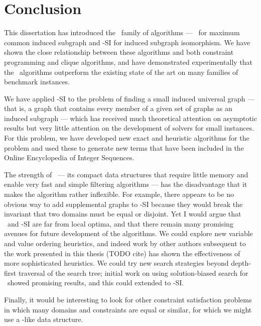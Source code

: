 \chapter{Conclusion}
\label{c:conclusion}

This dissertation has introduced the \McSplit\ family of algorithms ---
\McSplit\ for maximum common induced subgraph and \McSplit-SI for induced
subgraph isomorphism.  We have shown the close relationship between these
algorithms and both constraint programming and clique algorithms, and have
demonstrated experimentally that the \McSplit\ algorithms outperform the
existing state of the art on many families of benchmark instances.

We have applied \McSplit-SI to the problem of finding a small induced universal
graph --- that is, a graph that contains every member of a given set of graphs
as an induced subgraph --- which has received much theoretical attention on
asymptotic results but very little attention on the development of solvers for
small instances.  For this problem, we have developed new exact and heuristic
algorithms for the problem and used these to generate new terms that have been
included in the Online Encyclopedia of Integer Sequences.

The strength of \McSplit\ --- its compact data structures that require little
memory and enable very fast and simple filtering algorithms --- has the
disadvantage that it makes the algorithm rather inflexible.  For example, there
appears to be no obvious way to add supplemental graphs to \McSplit-SI because
they would break the invariant that two domains must be equal or disjoint.  Yet
I would argue that \McSplit\ and \McSplit-SI are far from local optima, and
that there remain many promising avenues for future development of the
algorithms.  We could explore new variable and value ordering heuristics, and
indeed work by other authors subsequent to the work presented in this thesis
(TODO cite) has shown the effectiveness of more sophisticated heuristics.  We
could try new search strategies beyond depth-first traversal of the search
tree; initial work on using solution-biased search for \McSplit\ showed
promising results, and this could extended to \McSplit-SI.

Finally, it would be interesting to look for other constraint satisfaction
problems in which many domains and constraints are equal or similar, for which
we might use a \McSplit-like data structure.
